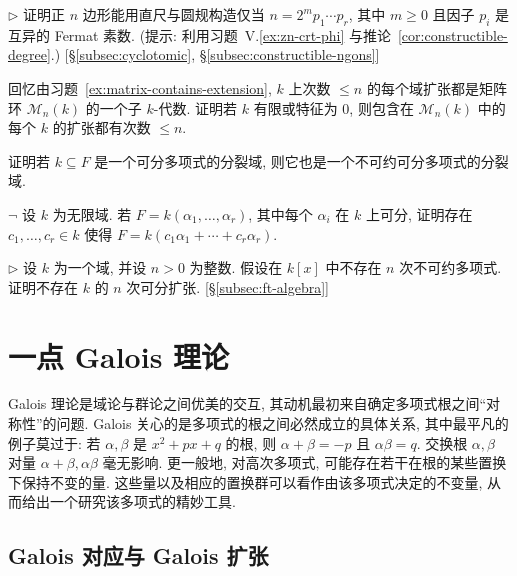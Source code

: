\begin{prob}\label{ex:regular-n-gon-constructible}
$\triangleright$ 证明正 $n$ 边形能用直尺与圆规构造仅当 $n=2^m p_1\cdots p_r$, 其中 $m\geq 0$ 且因子 $p_i$ 是互异的 Fermat 素数. (提示: 利用习题~V.\ref{ex:zn-crt-phi} 与推论~\ref{cor:constructible-degree}.) [§\ref{subsec:cyclotomic}, §\ref{subsec:constructible-ngons}]
\end{prob}

\begin{prob}\label{ex:matrix-contains-extension-finite}
回忆由习题~\ref{ex:matrix-contains-extension}, $k$ 上次数 $\leq n$ 的每个域扩张都是矩阵环 $\mathcal{M}_n(k)$ 的一个子 $k$-代数. 证明若 $k$ 有限或特征为 $0$, 则包含在 $\mathcal{M}_n(k)$ 中的每个 $k$ 的扩张都有次数 $\leq n$.
\end{prob}

\begin{prob}\label{ex:splitting-of-separable}
证明若 $k\subseteq F$ 是一个可分多项式的分裂域, 则它也是一个不可约可分多项式的分裂域.
\end{prob}

\begin{prob}\label{ex:separable-generation}
$\neg$ 设 $k$ 为无限域. 若 $F=k(\alpha_1,\ldots,\alpha_r)$, 其中每个 $\alpha_i$ 在 $k$ 上可分, 证明存在 $c_1,\ldots,c_r\in k$ 使得 $F=k(c_1\alpha_1+\cdots+c_r\alpha_r)$.
\end{prob}

\begin{prob}\label{ex:no-irred-no-sep-extension}
$\triangleright$ 设 $k$ 为一个域, 并设 $n>0$ 为整数. 假设在 $k[x]$ 中不存在 $n$ 次不可约多项式. 证明不存在 $k$ 的 $n$ 次可分扩张. [§\ref{subsec:ft-algebra}]
\end{prob}

\section{一点 Galois 理论}\label{sec:galois-theory}

Galois 理论是域论与群论之间优美的交互, 其动机最初来自确定多项式根之间``对称性''的问题. Galois 关心的是多项式的根之间必然成立的具体关系, 其中最平凡的例子莫过于: 若 $\alpha,\beta$ 是 $x^2+px+q$ 的根, 则 $\alpha+\beta=-p$ 且 $\alpha\beta=q$. 交换根 $\alpha,\beta$ 对量 $\alpha+\beta,\alpha\beta$ 毫无影响. 更一般地, 对高次多项式, 可能存在若干在根的某些置换下保持不变的量. 这些量以及相应的置换群可以看作由该多项式决定的不变量, 从而给出一个研究该多项式的精妙工具.

\subsection{Galois 对应与 Galois 扩张}\label{subsec:galois-correspondence}

